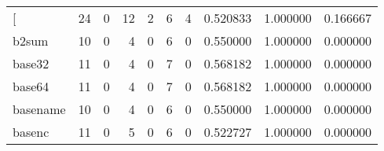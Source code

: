 \begin{longtable}{lrrrrrrrrr}
\bottomrule
\endlastfoot
{[}         &                                       24 &                                                  0 &                                                 12 &                                                  2 &                                                  6 &                                                  4 &                                           0.520833 &                               1.000000 &                             0.166667 \\
b2sum     &                                       10 &                                                  0 &                                                  4 &                                                  0 &                                                  6 &                                                  0 &                                           0.550000 &                               1.000000 &                             0.000000 \\
base32    &                                       11 &                                                  0 &                                                  4 &                                                  0 &                                                  7 &                                                  0 &                                           0.568182 &                               1.000000 &                             0.000000 \\
base64    &                                       11 &                                                  0 &                                                  4 &                                                  0 &                                                  7 &                                                  0 &                                           0.568182 &                               1.000000 &                             0.000000 \\
basename  &                                       10 &                                                  0 &                                                  4 &                                                  0 &                                                  6 &                                                  0 &                                           0.550000 &                               1.000000 &                             0.000000 \\
basenc    &                                       11 &                                                  0 &                                                  5 &                                                  0 &                                                  6 &                                                  0 &                                           0.522727 &                               1.000000 &                             0.000000 \\

\end{longtable}

